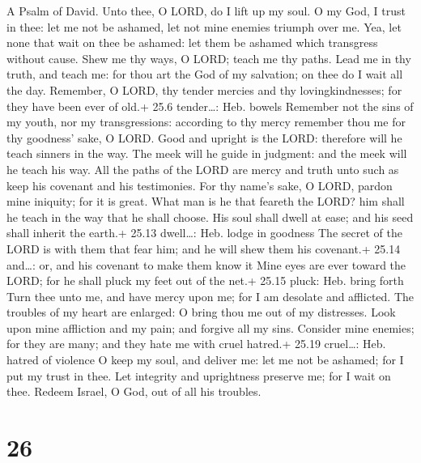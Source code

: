A Psalm of David.  Unto thee, O LORD, do I lift up my soul.
 O my God, I trust in thee: let me not be ashamed, let not
mine enemies triumph over me.  Yea, let none that wait on
thee be ashamed: let them be ashamed which transgress without cause.
 Shew me thy ways, O LORD; teach me thy paths. 
Lead me in thy truth, and teach me: for thou art the God of my
salvation; on thee do I wait all the day.  Remember, O LORD,
thy tender mercies and thy lovingkindnesses; for they have been ever of
old.+ 25.6 tender\ldots: Heb. bowels  Remember not the sins
of my youth, nor my transgressions: according to thy mercy remember thou
me for thy goodness' sake, O LORD.  Good and upright is the
LORD: therefore will he teach sinners in the way.  The meek
will he guide in judgment: and the meek will he teach his way.
 All the paths of the LORD are mercy and truth unto such as
keep his covenant and his testimonies.  For thy name's
sake, O LORD, pardon mine iniquity; for it is great.  What
man is he that feareth the LORD? him shall he teach in the way that he
shall choose.  His soul shall dwell at ease; and his seed
shall inherit the earth.+ 25.13 dwell\ldots: Heb. lodge in goodness
 The secret of the LORD is with them that fear him; and he
will shew them his covenant.+ 25.14 and\ldots: or, and his covenant to
make them know it  Mine eyes are ever toward the LORD; for
he shall pluck my feet out of the net.+ 25.15 pluck: Heb. bring forth
 Turn thee unto me, and have mercy upon me; for I am
desolate and afflicted.  The troubles of my heart are
enlarged: O bring thou me out of my distresses.  Look upon
mine affliction and my pain; and forgive all my sins. 
Consider mine enemies; for they are many; and they hate me with cruel
hatred.+ 25.19 cruel\ldots: Heb. hatred of violence  O keep
my soul, and deliver me: let me not be ashamed; for I put my trust in
thee.  Let integrity and uprightness preserve me; for I
wait on thee.  Redeem Israel, O God, out of all his
troubles.

\hypertarget{section-25}{%
\section{26}\label{section-25}}


